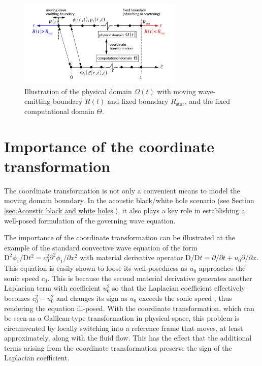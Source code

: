 \begin{figure}
    \centering
    \includegraphics[width=0.7\textwidth]{figures/domain3.pdf}
    \caption{Illustration of the physical domain $\Omega\left(t\right)$ with moving wave-emitting boundary $R\left(t\right)$ and fixed boundary $R_{\mathrm{stat}}$, and the fixed computational domain $\Theta$.}
    \label{fig:domain3}
\end{figure}

\section{Importance of the coordinate transformation}
\label{sec:Importance of the coordinate transformation}

The coordinate transformation is not only a convenient means to model the moving domain boundary. In the acoustic black/white hole scenario (see Section \ref{sec:Acoustic black and white holes}), it also plays a key role in establishing a well-posed formulation of the governing wave equation.

The importance of the coordinate transformation can be illustrated at the example of the standard convective wave equation of the form $\mathrm{D}^2\phi_1/\mathrm{D}t^2 = c_0^2\partial^2\phi_1/\partial x^2$ with material derivative operator $\mathrm{D}/\mathrm{D}t = \partial/\partial t + u_0\partial/\partial x$. This equation is easily shown to loose its well-posedness as $u_0$ approaches the sonic speed $c_0$. This is because the second material derivative generates another Laplacian term with coefficient $u_0^2$ so that the Laplacian coefficient effectively becomes $c_0^2-u_0^2$ and changes its sign as $u_0$ exceeds the sonic speed \citep{Schenke_et_al_2022_PoF}, thus rendering the equation ill-posed. With the coordinate transformation, which can be seen as a Galilean-type transformation in physical space, this problem is circumvented by locally switching into a reference frame that moves, at least approximately, along with the fluid flow. This has the effect that the additional terms arising from the coordinate transformation preserve the sign of the Laplacian coefficient.
